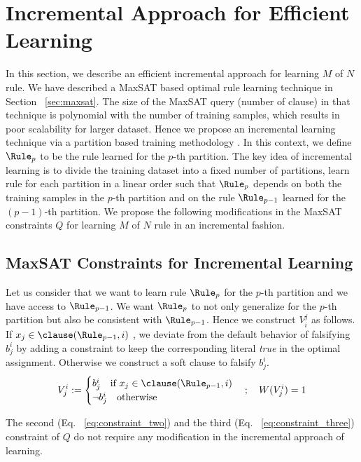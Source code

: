 \section{Incremental Approach for Efficient Learning }
In this section, we describe an efficient incremental approach for learning $ M $ of $ N $ rule. We have described a MaxSAT based optimal rule learning technique in Section ~\ref{sec:maxsat}. The size of the  MaxSAT query  (number of clause) in that technique is polynomial with the number of training samples, which results in poor scalability  for larger dataset.  Hence we propose an incremental learning technique via a partition based training methodology \cite{GM19}. In this context, we define $ \Rule_p $ to be the rule learned for the $ p $-th partition. The key idea of incremental learning is to  divide the training dataset into a fixed number of partitions, learn rule for each partition in a  linear order such that  $ \Rule_p $  depends on both the training samples in the $ p $-th partition and  on the  rule $ \Rule_{p-1} $ learned for the  $ (p-1) $-th partition.   We propose  the following modifications in the MaxSAT constraints $ Q $ for learning $ M $ of $ N $ rule in an incremental fashion.

\subsection{MaxSAT Constraints for Incremental Learning}
Let us consider that we want to learn rule $ \Rule_p $ for the $ p $-th partition and we have access to  $ \Rule_{p-1} $.  We want $ \Rule_p $ to not only generalize for the $ p $-th partition but also be consistent with $ \Rule_{p-1} $. Hence  we construct $ V_i^j $ as follows. If $ x_j \in \clause(\Rule_{p-1},i)  $ , we  deviate from the default behavior of falsifying $ b_j^i $ by adding a constraint to keep the corresponding literal \emph{true} in the optimal assignment. Otherwise we construct a soft clause to falsify $ b_j^i $. 
\[
V^i_j:=
\begin{cases}
b_j^i \quad \text{if }  x_j \in \clause(\Rule_{p-1},i)
\\
\neg b_j^i\quad \text{otherwise}
\end{cases}; \quad W(V_j^i)=1
\]

The second (Eq. ~\ref{eq:constraint_two}) and the third (Eq. ~\ref{eq:constraint_three}) constraint of $ Q $ do not require any modification in the  incremental approach of learning. 